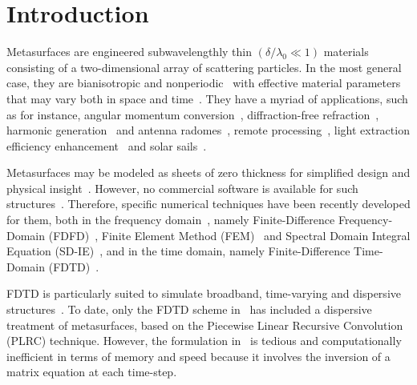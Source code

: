 \documentclass[journal]{IEEEtran}
\begin{document}
\section{Introduction}\label{sec:introduction}
Metasurfaces are engineered subwavelengthly thin $\left(\delta/\lambda_0\ll 1\right)$ materials consisting of a two-dimensional array of scattering particles. In the most general case, they are bianisotropic and nonperiodic~\cite{Kuester_AveragTransCond_2003, Karim_ms_suscp_syn_2015} with effective material parameters that may vary both in space and time~\cite{Nima_simultan_st_spect_2018, Nima_spacetie_proces_ms2016, Caloz_spacetime_ms2016}. They have a myriad of applications, such as for instance, angular momentum conversion~\cite{Capasso_angular_mom_dielec_ms2017}, diffraction-free refraction~\cite{Lavigne_Refr_ms_no_spurious_diffr2018}, harmonic generation~\cite{Karim_2ndorder_nonlinear_ms2017} and antenna radomes~\cite{Eleftheriades_Leaky_ant_ms2017, Esmaeli_Artf_magnet_ms_ant2018}, remote processing~\cite{Karim_remote_proces_2016}, light extraction efficiency enhancement~\cite{Luzhou_Spont_emmision_2016} and solar sails~\cite{Karim_Solar_sail_2017}.

Metasurfaces may be modeled as sheets of zero thickness for simplified design and physical insight~\cite{Alu_wave_transform_grad_ms2016, Maci_Modulated_ms_ant2015,Achouri_birefringent_ms2016, Nima_Exact_polychrom_ms_design2016, Karim_ms_suscp_syn_2015, Xiao_spherical_ms_synthesis2017, Safari_cylinderical_ms2017}. However, no commercial software is available for such structures~\cite{Yousef_Comput_analysis_ms2018}. Therefore, specific numerical techniques have been recently developed for them, both in the frequency domain~\cite{Yousef_Comput_analysis_ms2018, GSTC_FDFD_Yousef_2016, GSTC_FEM_Kumar2017, Nima_SD_IE2017}, namely Finite-Difference Frequency-Domain (FDFD)~\cite{GSTC_FDFD_Yousef_2016, GSTC_FDFD_Yousef_APS2016}, Finite Element Method (FEM)~\cite{GSTC_FEM_Kumar2017} and Spectral Domain Integral Equation (SD-IE)~\cite{Nima_SD_IE2017}, and in the time domain, namely Finite-Difference Time-Domain (FDTD)~\cite{Shulabh_FDTD_broadband_Huygens_ms2017, Shulabh_FDTD_space_time_ms2017, Shulabh_Integr_GSTC_FDTD2017, Achouri_nonlinear_ms2017, Xiao_ms_analys_FDTD2018, GSTC-FDTD_2018_Yousef, Hosseini_PLRCFDTD_GSTC_ms2018}.

FDTD is particularly suited to simulate broadband, time-varying and dispersive structures~\cite{Susan_FDTD2005}. To date, only the FDTD scheme in~\cite{Hosseini_PLRCFDTD_GSTC_ms2018} has included a dispersive treatment of metasurfaces, based on the Piecewise Linear Recursive Convolution (PLRC) technique. However, the formulation in~\cite{Hosseini_PLRCFDTD_GSTC_ms2018} is tedious and computationally inefficient in terms of memory and speed because it involves the inversion of a matrix equation at each time-step.
\end{document}
